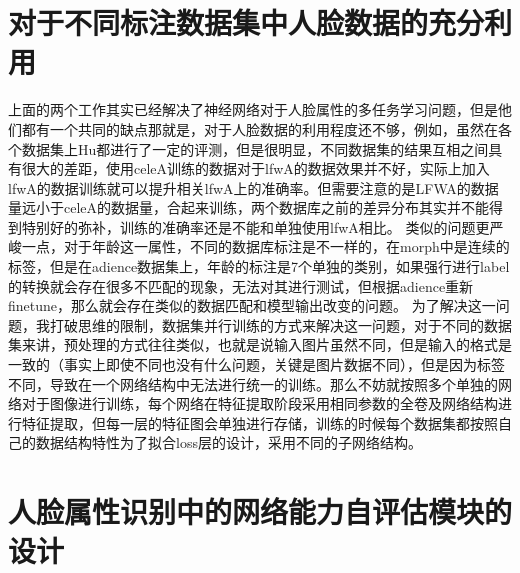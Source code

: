 \section{对于不同标注数据集中人脸数据的充分利用}
上面的两个工作其实已经解决了神经网络对于人脸属性的多任务学习问题，但是他们都有一个共同的缺点那就是，对于人脸数据的利用程度还不够，例如，虽然在各个数据集上Hu都进行了一定的评测，但是很明显，不同数据集的结果互相之间具有很大的差距，使用celeA训练的数据对于lfwA的数据效果并不好，实际上加入lfwA的数据训练就可以提升相关lfwA上的准确率。但需要注意的是LFWA的数据量远小于celeA的数据量，合起来训练，两个数据库之前的差异分布其实并不能得到特别好的弥补，训练的准确率还是不能和单独使用lfwA相比。
类似的问题更严峻一点，对于年龄这一属性，不同的数据库标注是不一样的，在morph中是连续的标签，但是在adience数据集上，年龄的标注是7个单独的类别，如果强行进行label的转换就会存在很多不匹配的现象，无法对其进行测试，但根据adience重新finetune，那么就会存在类似的数据匹配和模型输出改变的问题。
为了解决这一问题，我打破思维的限制，数据集并行训练的方式来解决这一问题，对于不同的数据集来讲，预处理的方式往往类似，也就是说输入图片虽然不同，但是输入的格式是一致的（事实上即使不同也没有什么问题，关键是图片数据不同），但是因为标签不同，导致在一个网络结构中无法进行统一的训练。那么不妨就按照多个单独的网络对于图像进行训练，每个网络在特征提取阶段采用相同参数的全卷及网络结构进行特征提取，但每一层的特征图会单独进行存储，训练的时候每个数据集都按照自己的数据结构特性为了拟合loss层的设计，采用不同的子网络结构。



\section{人脸属性识别中的网络能力自评估模块的设计}

